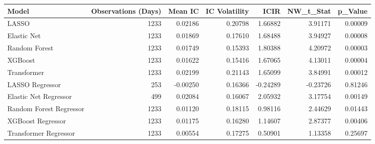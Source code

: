 \begin{tabular}{lrrrrrr}
\toprule
Model & Observations (Days) & Mean IC & IC Volatility & ICIR & NW\_t\_Stat & p\_Value \\
\midrule
LASSO & 1233 & 0.02186 & 0.20798 & 1.66882 & 3.91171 & 0.00009 \\
Elastic Net & 1233 & 0.01869 & 0.17610 & 1.68488 & 3.94927 & 0.00008 \\
Random Forest & 1233 & 0.01749 & 0.15393 & 1.80388 & 4.20972 & 0.00003 \\
XGBoost & 1233 & 0.01622 & 0.15416 & 1.67065 & 4.13011 & 0.00004 \\
Transformer & 1233 & 0.02199 & 0.21143 & 1.65099 & 3.84991 & 0.00012 \\
LASSO Regressor & 253 & -0.00250 & 0.16366 & -0.24289 & -0.23726 & 0.81246 \\
Elastic Net Regressor & 499 & 0.02084 & 0.16067 & 2.05932 & 3.17754 & 0.00149 \\
Random Forest Regressor & 1233 & 0.01120 & 0.18115 & 0.98116 & 2.44629 & 0.01443 \\
XGBoost Regressor & 1233 & 0.01175 & 0.16280 & 1.14607 & 2.87377 & 0.00406 \\
Transformer Regressor & 1233 & 0.00554 & 0.17275 & 0.50901 & 1.13358 & 0.25697 \\
\bottomrule
\end{tabular}
